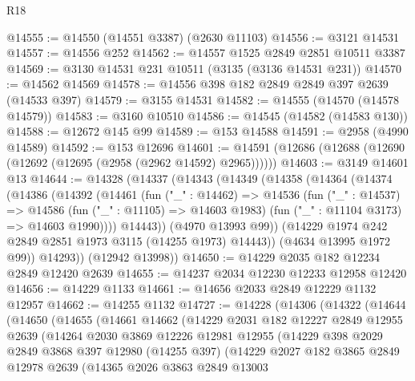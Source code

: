 \begin{lexlean}{R18}
\begin{coremodule}
@14555 := @14550 (@14551 @3387) (@2630 @11103)
@14556 := @3121 @14531
@14557 := @14556 @252
@14562 := @14557 @1525 @2849 @2851 @10511 @3387
@14569 := @3130 @14531 @231 @10511 (@3135 (@3136 @14531 @231))
@14570 := @14562 @14569
@14578 := @14556 @398 @182 @2849 @2849 @397 @2639 (@14533 @397)
@14579 := @3155 @14531
@14582 := @14555 (@14570 (@14578 @14579))
@14583 := @3160 @10510
@14586 := @14545 (@14582 (@14583 @130))
@14588 := @12672 @145 @99
@14589 := @153 @14588
@14591 := @2958 (@4990 @14589)
@14592 := @153 @12696
@14601 := @14591 (@12686 (@12688 (@12690 (@12692 (@12695 (@2958 (@2962 @14592) @2965))))))
@14603 := @3149 @14601 @13
@14644 := @14328
    (@14337
      (@14343
        (@14349
          (@14358
            (@14364
              (@14374
                (@14386
                  (@14392
                    (@14461
                      (fun ("_" : @14462) =>
                      @14536
                        (fun ("_" : @14537) =>
                        @14586
                          (fun ("_" : @11105) => @14603 @1983)
                          (fun ("_" : @11104 @3173) => @14603 @1990))))
                    @14443))
                (@4970 @13993 @99))
              (@14229 @1974 @242 @2849 @2851 @1973 @3115 (@14255 @1973) @14443))
            (@4634 @13995 @1972 @99))
          @14293))
      (@12942 @13998))
@14650 := @14229 @2035 @182 @12234 @2849 @12420 @2639
@14655 := @14237 @2034 @12230 @12233 @12958 @12420
@14656 := @14229 @1133
@14661 := @14656 @2033 @2849 @12229 @1132 @12957
@14662 := @14255 @1132
@14727 := @14228
    (@14306
      (@14322
        (@14644
          (@14650
            (@14655
              (@14661
                @14662
                (@14229
                  @2031
                  @182
                  @12227
                  @2849
                  @12955
                  @2639
                  (@14264
                    @2030
                    @3869
                    @12226
                    @12981
                    @12955
                    (@14229
                      @398
                      @2029
                      @2849
                      @3868
                      @397
                      @12980
                      (@14255 @397)
                      (@14229
                        @2027
                        @182
                        @3865
                        @2849
                        @12978
                        @2639
                        (@14365
                          @2026
                          @3863
                          @2849
                          @13003

\end{coremodule}
\end{lexlean}
